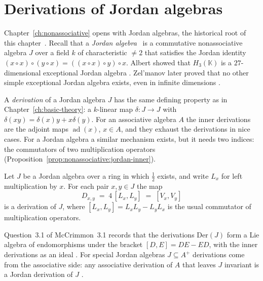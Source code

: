 \section{Derivations of Jordan algebras}\label{sec:nonassociative:jordan-algebras}

Chapter~\ref{ch:nonassociative} opens with Jordan algebras, the historical
root of this chapter~\cite[pp.~103--111]{Zelmanov1979Prime}. Recall that a \emph{Jordan algebra}~\cite[Section~2.4,
p.~57]{McCrimmon2004Taste} is a commutative nonassociative algebra $J$ over a
field $k$ of characteristic $\neq 2$ that satisfies the Jordan identity
$(x\circ x)\circ(y\circ x) = ((x\circ x)\circ y)\circ x$. Albert showed that
$H_3(\mathbb{K})$ is a $27$-dimensional exceptional Jordan algebra
\cite[p.~971]{McCrimmon2004Taste}. Zel'manov later proved that no other simple
exceptional Jordan algebra exists, even in infinite dimensions
\cite[pp.~103--111]{Zelmanov1979Prime}.

A \emph{derivation} of a Jordan algebra $J$ has the same defining property as
in Chapter~\ref{ch:basic-theory}: a $k$-linear map $\delta\colon J\to J$ with
$\delta(xy)=\delta(x)y+x\delta(y)$. For an associative algebra $A$ the inner
derivations are the adjoint maps $\operatorname{ad}(x)$, $x\in A$, and they
exhaust the derivations in nice cases. For a Jordan algebra a similar
mechanism exists, but it needs two indices: the commutators of two
multiplication operators (Proposition~\ref{prop:nonassociative:jordan-inner}).

\begin{proposition}
\label{prop:nonassociative:jordan-inner}
Let $J$ be a Jordan algebra over a ring in which $\tfrac{1}{2}$ exists,
and write $L_x$ for left multiplication by $x$. For each pair $x,y\in J$
the map
\[
D_{x,y}\;=\;4\,[L_x,L_y]\;=\;[V_x,V_y]
\]
is a derivation of $J$, where $[L_x,L_y]=L_xL_y-L_yL_x$ is the usual
commutator of multiplication operators.
\end{proposition}

Question~3.1 of McCrimmon~3.1 records that the derivations
$\mathrm{Der}(J)$ form a Lie algebra of endomorphisms under the bracket
$[D,E]=DE-ED$, with the inner derivations as an ideal
\cite[Question~3.1, p.~185]{McCrimmon2004Taste}. For special Jordan
algebras $J\subseteq A^{+}$ derivations come from the associative side:
any associative derivation of $A$ that leaves $J$ invariant is a Jordan
derivation of $J$ \cite[Problem~3.6~(2), p.~185]{McCrimmon2004Taste}.


